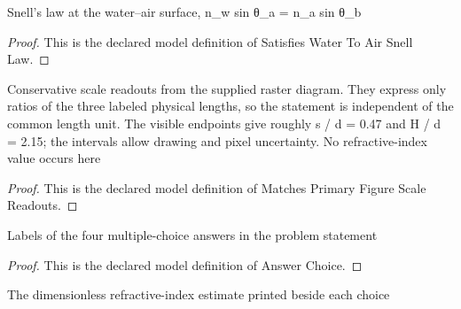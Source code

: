 \begin{definition}
  \label{def:physics:phyx-mini-0095:phyxminiproblems-problemphyxmini0095-satisfieswatertoairsnelllaw}
  Snell's law at the water--air surface, n\_w sin θ\_a = n\_a sin θ\_b
\end{definition}
\begin{proof}
  This is the declared model definition of Satisfies Water To Air Snell Law.
\end{proof}
\begin{definition}
  \label{def:physics:phyx-mini-0095:phyxminiproblems-problemphyxmini0095-matchesprimaryfigurescalereadouts}
  Conservative scale readouts from the supplied raster diagram. They express only ratios of the three labeled physical lengths, so the statement is independent of the common length unit. The visible endpoints give roughly s / d = 0.47 and H / d = 2.15; the intervals allow drawing and pixel uncertainty. No refractive-index value occurs here
\end{definition}
\begin{proof}
  This is the declared model definition of Matches Primary Figure Scale Readouts.
\end{proof}
\begin{definition}
  \label{def:physics:phyx-mini-0095:phyxminiproblems-problemphyxmini0095-answerchoice}
  Labels of the four multiple-choice answers in the problem statement
\end{definition}
\begin{proof}
  This is the declared model definition of Answer Choice.
\end{proof}
\begin{definition}
  \label{def:physics:phyx-mini-0095:phyxminiproblems-problemphyxmini0095-answerrefractiveindex}
  The dimensionless refractive-index estimate printed beside each choice
\end{definition}
